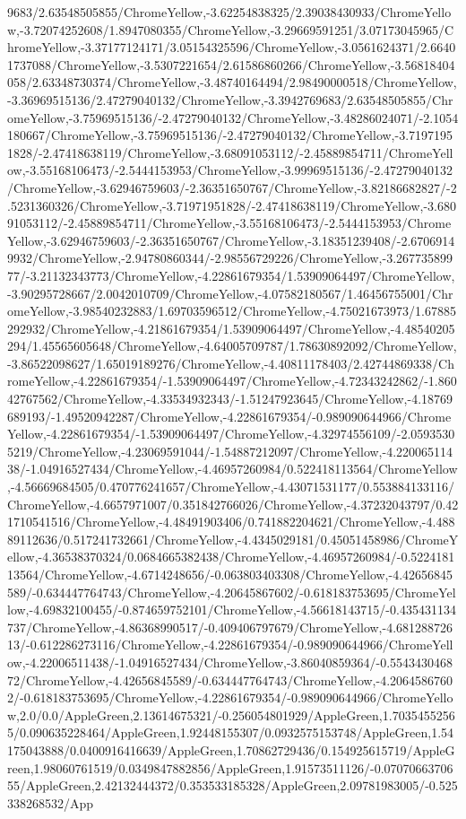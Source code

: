 {\begin{tikzternal}
9683/2.63548505855/ChromeYellow,-3.62254838325/2.39038430933/ChromeYellow,-3.72074252608/1.8947080355/ChromeYellow,-3.29669591251/3.07173045965/ChromeYellow,-3.37177124171/3.05154325596/ChromeYellow,-3.0561624371/2.66401737088/ChromeYellow,-3.5307221654/2.61586860266/ChromeYellow,-3.56818404058/2.63348730374/ChromeYellow,-3.48740164494/2.98490000518/ChromeYellow,-3.36969515136/2.47279040132/ChromeYellow,-3.3942769683/2.63548505855/ChromeYellow,-3.75969515136/-2.47279040132/ChromeYellow,-3.48286024071/-2.1054180667/ChromeYellow,-3.75969515136/-2.47279040132/ChromeYellow,-3.71971951828/-2.47418638119/ChromeYellow,-3.68091053112/-2.45889854711/ChromeYellow,-3.55168106473/-2.5444153953/ChromeYellow,-3.99969515136/-2.47279040132/ChromeYellow,-3.62946759603/-2.36351650767/ChromeYellow,-3.82186682827/-2.5231360326/ChromeYellow,-3.71971951828/-2.47418638119/ChromeYellow,-3.68091053112/-2.45889854711/ChromeYellow,-3.55168106473/-2.5444153953/ChromeYellow,-3.62946759603/-2.36351650767/ChromeYellow,-3.18351239408/-2.67069149932/ChromeYellow,-2.94780860344/-2.98556729226/ChromeYellow,-3.26773589977/-3.21132343773/ChromeYellow,-4.22861679354/1.53909064497/ChromeYellow,-3.90295728667/2.0042010709/ChromeYellow,-4.07582180567/1.46456755001/ChromeYellow,-3.98540232883/1.69703596512/ChromeYellow,-4.75021673973/1.67885292932/ChromeYellow,-4.21861679354/1.53909064497/ChromeYellow,-4.48540205294/1.45565605648/ChromeYellow,-4.64005709787/1.78630892092/ChromeYellow,-3.86522098627/1.65019189276/ChromeYellow,-4.40811178403/2.42744869338/ChromeYellow,-4.22861679354/-1.53909064497/ChromeYellow,-4.72343242862/-1.86042767562/ChromeYellow,-4.33534932343/-1.51247923645/ChromeYellow,-4.18769689193/-1.49520942287/ChromeYellow,-4.22861679354/-0.989090644966/ChromeYellow,-4.22861679354/-1.53909064497/ChromeYellow,-4.32974556109/-2.05935305219/ChromeYellow,-4.23069591044/-1.54887212097/ChromeYellow,-4.22006511438/-1.04916527434/ChromeYellow,-4.46957260984/0.522418113564/ChromeYellow,-4.56669684505/0.470776241657/ChromeYellow,-4.43071531177/0.553884133116/ChromeYellow,-4.6657971007/0.351842766026/ChromeYellow,-4.37232043797/0.421710541516/ChromeYellow,-4.48491903406/0.741882204621/ChromeYellow,-4.48889112636/0.517241732661/ChromeYellow,-4.4345029181/0.45051458986/ChromeYellow,-4.36538370324/0.0684665382438/ChromeYellow,-4.46957260984/-0.522418113564/ChromeYellow,-4.6714248656/-0.063803403308/ChromeYellow,-4.42656845589/-0.634447764743/ChromeYellow,-4.20645867602/-0.618183753695/ChromeYellow,-4.69832100455/-0.874659752101/ChromeYellow,-4.56618143715/-0.435431134737/ChromeYellow,-4.86368990517/-0.409406797679/ChromeYellow,-4.68128872613/-0.612286273116/ChromeYellow,-4.22861679354/-0.989090644966/ChromeYellow,-4.22006511438/-1.04916527434/ChromeYellow,-3.86040859364/-0.554343046872/ChromeYellow,-4.42656845589/-0.634447764743/ChromeYellow,-4.20645867602/-0.618183753695/ChromeYellow,-4.22861679354/-0.989090644966/ChromeYellow,2.0/0.0/AppleGreen,2.13614675321/-0.256054801929/AppleGreen,1.70354552565/0.090635228464/AppleGreen,1.92448155307/0.0932575153748/AppleGreen,1.54175043888/0.0400916416639/AppleGreen,1.70862729436/0.154925615719/AppleGreen,1.98060761519/0.0349847882856/AppleGreen,1.91573511126/-0.0707066370655/AppleGreen,2.42132444372/0.353533185328/AppleGreen,2.09781983005/-0.525338268532/App
\end{tikzternal}}
